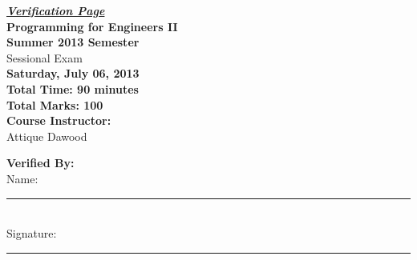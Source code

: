 \documentclass[12pt,a4paper]{article}
\begin{document}
\begin{center}
{\Huge \underline{\textbf{\textit{Verification Page}}}}\\[1.75cm]
{\LARGE \textbf{Programming for Engineers II}}\\[0.15cm]
{\normalsize \textbf{Summer 2013 Semester}}\\[0.15cm]
{\Large {Sessional Exam}}\\[0.15cm]
{\normalsize \textbf{Saturday, July 06, 2013}}\\[0.45cm]
{\Large \textbf{Total Time: 90 minutes}}\\[0.15cm]
{\Large \textbf{Total Marks: 100}}\\[0.35cm]
\textbf{Course Instructor:}\\
Attique Dawood\\[0.5cm]
\end{center}
\textbf{Verified By:}\\[0.55cm]
Name: \rule{5.65cm}{0.2mm}\\[0.55cm]
Signature: \rule{5cm}{0.2mm}\\[0.55cm]
\end{document}
